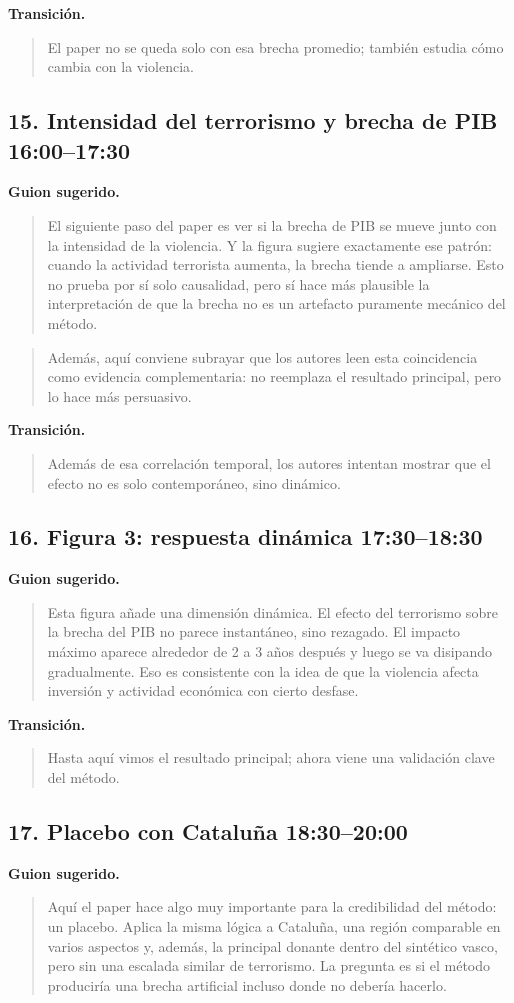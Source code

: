 \documentclass[11pt]{article}
\newcommand{\slideentry}[2]{\subsection*{#1 \hfill #2}}
\begin{document}
\textbf{Transición.}
\begin{quote}
El paper no se queda solo con esa brecha promedio; también estudia cómo cambia con la violencia.
\end{quote}

\slideentry{15. Intensidad del terrorismo y brecha de PIB}{16:00--17:30}

\textbf{Guion sugerido.}
\begin{quote}
El siguiente paso del paper es ver si la brecha de PIB se mueve junto con la intensidad de la violencia. Y la figura sugiere exactamente ese patrón: cuando la actividad terrorista aumenta, la brecha tiende a ampliarse. Esto no prueba por sí solo causalidad, pero sí hace más plausible la interpretación de que la brecha no es un artefacto puramente mecánico del método.
\end{quote}

\begin{quote}
Además, aquí conviene subrayar que los autores leen esta coincidencia como evidencia complementaria: no reemplaza el resultado principal, pero lo hace más persuasivo.
\end{quote}

\textbf{Transición.}
\begin{quote}
Además de esa correlación temporal, los autores intentan mostrar que el efecto no es solo contemporáneo, sino dinámico.
\end{quote}

\slideentry{16. Figura 3: respuesta dinámica}{17:30--18:30}

\textbf{Guion sugerido.}
\begin{quote}
Esta figura añade una dimensión dinámica. El efecto del terrorismo sobre la brecha del PIB no parece instantáneo, sino rezagado. El impacto máximo aparece alrededor de 2 a 3 años después y luego se va disipando gradualmente. Eso es consistente con la idea de que la violencia afecta inversión y actividad económica con cierto desfase.
\end{quote}

\textbf{Transición.}
\begin{quote}
Hasta aquí vimos el resultado principal; ahora viene una validación clave del método.
\end{quote}

\slideentry{17. Placebo con Cataluña}{18:30--20:00}

\textbf{Guion sugerido.}
\begin{quote}
Aquí el paper hace algo muy importante para la credibilidad del método: un placebo. Aplica la misma lógica a Cataluña, una región comparable en varios aspectos y, además, la principal donante dentro del sintético vasco, pero sin una escalada similar de terrorismo. La pregunta es si el método produciría una brecha artificial incluso donde no debería hacerlo.
\end{quote}
\end{document}
